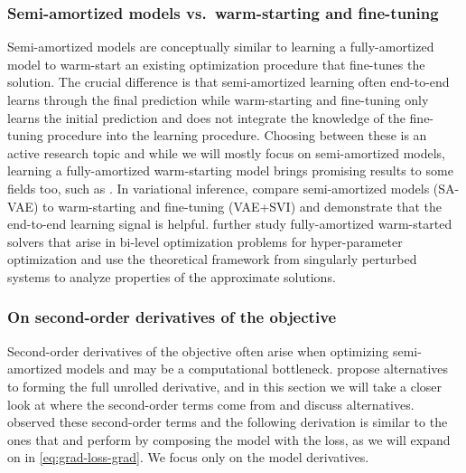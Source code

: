 \documentclass[twoside,11pt]{article}
\begin{document}
\subsubsection{Semi-amortized models vs.~warm-starting and fine-tuning}
Semi-amortized models are conceptually similar to learning a fully-amortized model
to warm-start an existing optimization procedure that fine-tunes the solution.
The crucial difference is that semi-amortized learning often end-to-end learns
through the final prediction while warm-starting and fine-tuning only learns
the initial prediction and does not integrate the knowledge of the fine-tuning
procedure into the learning procedure.
Choosing between these is an active research topic and while we will
mostly focus on semi-amortized models, learning a fully-amortized
warm-starting model brings promising results to some fields too,
such as \citet{zhang2019safe,baker2019learning,chen2022large}.
In variational inference, \citet[Table 2]{kim2018semi} compare semi-amortized
models (SA-VAE) to warm-starting and fine-tuning (VAE+SVI) and demonstrate
that the end-to-end learning signal is helpful.
\citet{arbel2021amortized} further study fully-amortized warm-started
solvers that arise in bi-level optimization problems for
hyper-parameter optimization and use the theoretical framework from
singularly perturbed systems \citep{habets2010stabilite}
to analyze properties of the approximate solutions.

\subsubsection{On second-order derivatives of the objective}
\label{sec:second-derivatives}
Second-order derivatives of the objective often arise when optimizing
semi-amortized models and may be a computational bottleneck.
\citet{finn2017model,nichol2018first,lorraine2020optimizing}
propose alternatives to forming the full unrolled derivative,
and in this section we will take a closer look at where the
second-order terms come from and discuss alternatives.
\citet{finn2017model} observed these second-order terms and
the following derivation is similar to the ones that
\citet[Section 5]{nichol2018first} and \citet{weng2018metalearning}
perform by composing the model with the loss, as we will expand on
in \cref{eq:grad-loss-grad}. We focus only on the
model derivatives.
\end{document}
